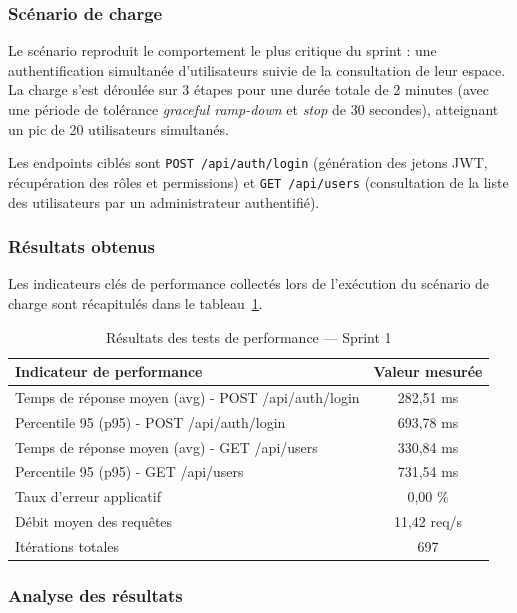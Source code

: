 \subsubsection{Scénario de charge}

Le scénario reproduit le comportement le plus critique du sprint :
une authentification simultanée d'utilisateurs suivie de la
consultation de leur espace. La charge s'est déroulée sur 3 étapes 
pour une durée totale de 2 minutes (avec une période de tolérance 
\textit{graceful ramp-down} et \textit{stop} de 30 secondes), atteignant 
un pic de 20 utilisateurs simultanés.

Les endpoints ciblés sont \texttt{POST /api/auth/login} (génération des
jetons JWT, récupération des rôles et permissions) et
\texttt{GET /api/users} (consultation de la liste des utilisateurs par
un administrateur authentifié).

\subsubsection{Résultats obtenus}
Les indicateurs clés de performance collectés lors de l'exécution du scénario de charge sont récapitulés dans le tableau~\ref{tab:perf_sprint1}.
\begin{table}[H]
\centering
\renewcommand{\arraystretch}{1.3}
\begin{tabular}{|l|c|}
\hline
\textbf{Indicateur de performance} & \textbf{Valeur mesurée} \\
\hline
Temps de réponse moyen (avg) - POST /api/auth/login & 282,51 ms \\
\hline
Percentile 95 (p95) - POST /api/auth/login & 693,78 ms \\
\hline
Temps de réponse moyen (avg) - GET /api/users & 330,84 ms \\
\hline
Percentile 95 (p95) - GET /api/users & 731,54 ms \\
\hline
Taux d'erreur applicatif & 0,00 \% \\
\hline
Débit moyen des requêtes & 11,42 req/s \\
\hline
Itérations totales & 697 \\
\hline
\end{tabular}
\caption{Résultats des tests de performance — Sprint 1}
\label{tab:perf_sprint1}
\end{table}

\subsubsection{Analyse des résultats}

